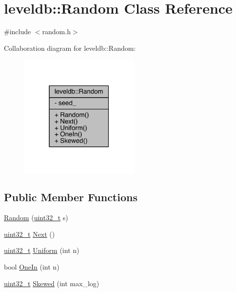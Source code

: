 \hypertarget{classleveldb_1_1_random}{}\section{leveldb\+:\+:Random Class Reference}
\label{classleveldb_1_1_random}


{\ttfamily \#include $<$random.\+h$>$}



Collaboration diagram for leveldb\+:\+:Random\+:\nopagebreak
\begin{figure}[H]
\begin{center}
\leavevmode
\includegraphics[width=171pt]{classleveldb_1_1_random__coll__graph}
\end{center}
\end{figure}
\subsection*{Public Member Functions}
\begin{DoxyCompactItemize}
\item 
\hyperlink{classleveldb_1_1_random_a1c0c29265d466774943d8e3769abc411}{Random} (\hyperlink{stdint_8h_a435d1572bf3f880d55459d9805097f62}{uint32\+\_\+t} s)
\item 
\hyperlink{stdint_8h_a435d1572bf3f880d55459d9805097f62}{uint32\+\_\+t} \hyperlink{classleveldb_1_1_random_a9e00ef1fcc82ed0ad16ba91b30ae8038}{Next} ()
\item 
\hyperlink{stdint_8h_a435d1572bf3f880d55459d9805097f62}{uint32\+\_\+t} \hyperlink{classleveldb_1_1_random_a9281323c3f115fa47a0f329f72ad2a80}{Uniform} (int n)
\item 
bool \hyperlink{classleveldb_1_1_random_abed35e25c0e08c2c4cb6d06b62cd1b73}{One\+In} (int n)
\item 
\hyperlink{stdint_8h_a435d1572bf3f880d55459d9805097f62}{uint32\+\_\+t} \hyperlink{classleveldb_1_1_random_a41987dcc7818d7bc0e68e2418c51d94e}{Skewed} (int max\+\_\+log)
\end{DoxyCompactItemize}
